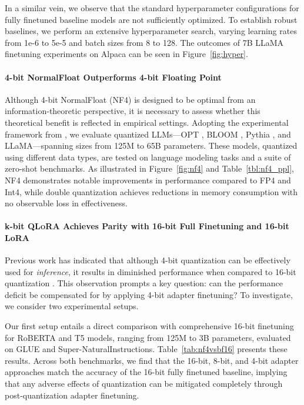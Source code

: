 In a similar vein, we observe that the standard hyperparameter configurations for fully finetuned baseline models are not sufficiently optimized. To establish robust baselines, we perform an extensive hyperparameter search, varying learning rates from 1e-6 to 5e-5 and batch sizes from 8 to 128. The outcomes of 7B LLaMA finetuning experiments on Alpaca can be seen in Figure~\ref{fig:hyper}.

\paragraph{4-bit NormalFloat Outperforms 4-bit Floating Point}

Although 4-bit NormalFloat (NF4) is designed to be optimal from an information-theoretic perspective, it is necessary to assess whether this theoretical benefit is reflected in empirical settings. Adopting the experimental framework from \citet{dettmers2022case}, we evaluate quantized LLMs—OPT \citep{zhang2022opt}, BLOOM \cite{scao2022bloom}, Pythia \cite{biderman2023pythia}, and LLaMA—spanning sizes from 125M to 65B parameters. These models, quantized using different data types, are tested on language modeling tasks and a suite of zero-shot benchmarks. As illustrated in Figure~\ref{fig:nf4} and Table~\ref{tbl:nf4_ppl}, NF4 demonstrates notable improvements in performance compared to FP4 and Int4, while double quantization achieves reductions in memory consumption with no observable loss in effectiveness.

\paragraph{k-bit \textsc{QLoRA} Achieves Parity with 16-bit Full Finetuning and 16-bit LoRA}

Previous work has indicated that although 4-bit quantization can be effectively used for \emph{inference}, it results in diminished performance when compared to 16-bit quantization \citep{dettmers2022case,frantar2022gptq}. This observation prompts a key question: can the performance deficit be compensated for by applying 4-bit adapter finetuning? To investigate, we consider two experimental setups.

Our first setup entails a direct comparison with comprehensive 16-bit finetuning for RoBERTA and T5 models, ranging from 125M to 3B parameters, evaluated on GLUE and Super-NaturalInstructions. Table~\ref{tab:nf4vsbf16} presents these results. Across both benchmarks, we find that the 16-bit, 8-bit, and 4-bit adapter approaches match the accuracy of the 16-bit fully finetuned baseline, implying that any adverse effects of quantization can be mitigated completely through post-quantization adapter finetuning.

